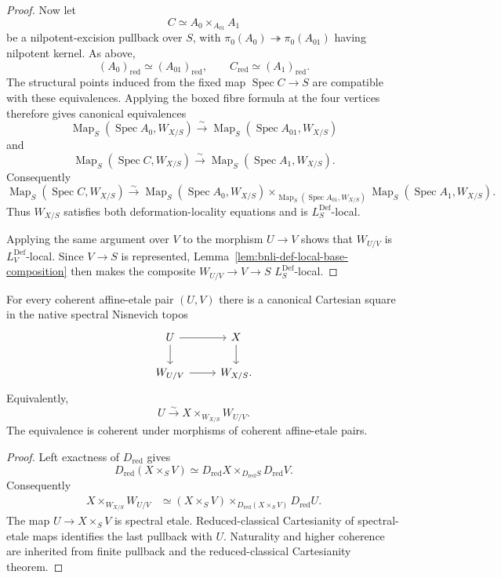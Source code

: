\begin{proof}
Now let
\[
    C\simeq A_0\times_{A_{01}}A_1
\]
be a nilpotent-excision pullback over $S$, with
$\pi_0(A_0)\twoheadrightarrow\pi_0(A_{01})$ having nilpotent kernel.  As
above,
\[
    (A_0)_{\mathrm{red}}\simeq(A_{01})_{\mathrm{red}},
    \qquad
    C_{\mathrm{red}}\simeq(A_1)_{\mathrm{red}}.
\]
The structural points induced from the fixed map $\operatorname{Spec}C\to S$
are compatible with these equivalences.  Applying the boxed fibre formula at
the four vertices therefore gives canonical equivalences
\[
    \operatorname{Map}_S(\operatorname{Spec}A_0,W_{X/S})
    \xrightarrow{\sim}
    \operatorname{Map}_S(\operatorname{Spec}A_{01},W_{X/S})
\]
and
\[
    \operatorname{Map}_S(\operatorname{Spec}C,W_{X/S})
    \xrightarrow{\sim}
    \operatorname{Map}_S(\operatorname{Spec}A_1,W_{X/S}).
\]
Consequently
\[
    \operatorname{Map}_S(\operatorname{Spec}C,W_{X/S})
    \xrightarrow{\sim}
    \operatorname{Map}_S(\operatorname{Spec}A_0,W_{X/S})
    \times_{\operatorname{Map}_S(\operatorname{Spec}A_{01},W_{X/S})}
    \operatorname{Map}_S(\operatorname{Spec}A_1,W_{X/S}).
\]
Thus $W_{X/S}$ satisfies both deformation-locality equations and is
$L_S^{\mathrm{Def}}$-local.

Applying the same argument over $V$ to the morphism $U\to V$ shows that
$W_{U/V}$ is $L_V^{\mathrm{Def}}$-local.  Since $V\to S$ is represented,
Lemma~\ref{lem:bnli-def-local-base-composition} then makes the composite
$W_{U/V}\to V\to S$ $L_S^{\mathrm{Def}}$-local.
\end{proof}

\begin{proposition}
\label{prop:bnli-relative-reduced-cartesianity}
For every coherent affine-etale pair $(U,V)$ there is a canonical Cartesian
square in the native spectral Nisnevich topos
\[
\begin{tikzcd}
U \arrow[r] \arrow[d] & X \arrow[d]\\
W_{U/V} \arrow[r] & W_{X/S}.
\end{tikzcd}
\]
Equivalently,
\[
\boxed{
    U
    \xrightarrow{\sim}
    X\times_{W_{X/S}}W_{U/V}.}
\]
The equivalence is coherent under morphisms of coherent affine-etale pairs.
\end{proposition}

\begin{proof}
Left exactness of $D_{\mathrm{red}}$ gives
\[
    D_{\mathrm{red}}(X\times_SV)
    \simeq
    D_{\mathrm{red}}X
    \times_{D_{\mathrm{red}}S}
    D_{\mathrm{red}}V.
\]
Consequently
\[
\begin{aligned}
    X\times_{W_{X/S}}W_{U/V}
    &\simeq
    (X\times_SV)
    \times_{D_{\mathrm{red}}(X\times_SV)}
    D_{\mathrm{red}}U.
\end{aligned}
\]
The map $U\to X\times_SV$ is spectral etale.  Reduced-classical Cartesianity
of spectral-etale maps identifies the last pullback with $U$.  Naturality and
higher coherence are inherited from finite pullback and the
reduced-classical Cartesianity theorem.
\end{proof}

